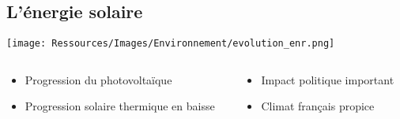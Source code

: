 \documentclass[xcolor=x11names, compress, 11pt]{beamer}
\begin{document}
\subsection{L’énergie solaire}
\begin{frame}[c]
    \vfill
    \centering
    \texttt{[image: Ressources/Images/Environnement/evolution\_enr.png]}
    \begin{columns}
        \begin{column}{0.45\textwidth}
            \begin{center}
                \begin{itemize}
                    \item Progression du photovoltaïque
                    \item Progression solaire thermique en baisse
                \end{itemize}
            \end{center}
        \end{column}%
        \begin{column}{0.45\textwidth}
            \begin{center}
                \begin{itemize}
                    \item Impact politique important
                    \item Climat français propice
                \end{itemize}
            \end{center}
        \end{column}%
    \end{columns}%
    \vfill
\end{frame}
\end{document}
